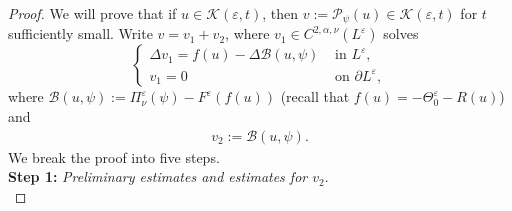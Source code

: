 \documentclass[11pt]{amsart}
\theoremstyle{definition}
\theoremstyle{remark}
\begin{document}
\begin{proof}
    We will prove that if $u \in \mathscr{K}(\varepsilon, t)$, then $v := \mathcal{P}_\psi(u) \in \mathscr{K}(\varepsilon,t)$ for $t$ sufficiently small. Write $v = v_1 + v_2$, where $v_1 \in C^{2,\alpha,\nu}(L^\varepsilon)$  solves 
    \begin{equation}
        \begin{cases}
    \Delta v_1 = f(u) - \Delta \mathcal{B}(u,\psi) &\text{ in } L^\varepsilon, \\
            v_1 = 0 &\text{ on } \partial L^\varepsilon,
        \end{cases} \label{v1}
    \end{equation}
    where $\mathcal{B}(u,\psi):=\Pi_{\nu}^\varepsilon(\psi)-F^\varepsilon(f(u))$ (recall that $f(u)=-\Theta_0^\varepsilon-R(u)$) and
    \begin{align*}
        v_2 := \mathcal{B}(u,\psi). \label{v2}
    \end{align*}
 We break the proof into five steps. \\
 
    \noindent
    \textbf{Step 1:} \emph{Preliminary estimates and estimates for $v_2$}. \\
    

\end{proof}
\end{document}
